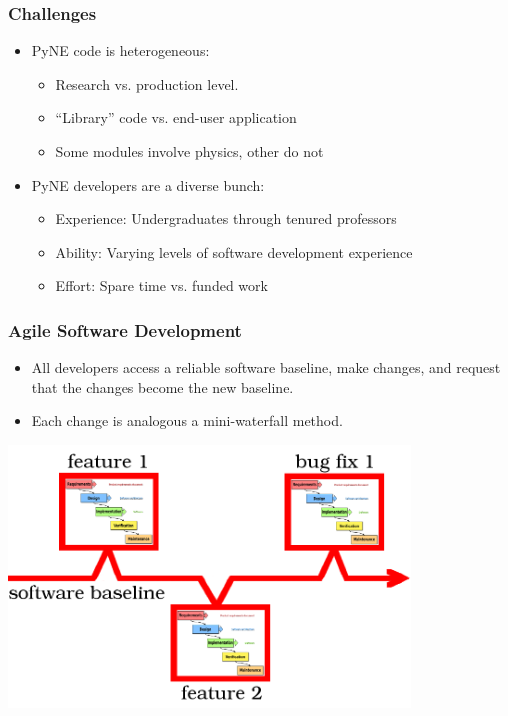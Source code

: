 \documentclass[12pt]{beamer}
\begin{document}
\begin{frame}[fragile]
\frametitle{Challenges}

\begin{itemize}
\item{PyNE code is heterogeneous:}
    \begin{itemize}
    \item{Research vs. production level.}
    \item{``Library'' code vs. end-user application}
    \item{Some modules involve physics, other  do not}
    \end{itemize}
\item{PyNE developers are a diverse bunch}:
   \begin{itemize}
   \item{Experience: Undergraduates through tenured professors}
   \item{Ability: Varying levels of software development experience}
   \item{Effort: Spare time vs. funded work}
   \end{itemize}
\end{itemize}

\end{frame}
\begin{frame}
\frametitle{Agile Software Development\cite{larman2004agile}}

\begin{itemize}
\item{All developers access a reliable software baseline, make changes, and request that the changes become the new baseline.}
\item{Each change is analogous a mini-waterfall method.}
\end{itemize}

\centerline{\includegraphics[width=0.8\textwidth]{figures/agile.png}}

\end{frame}
\end{document}
